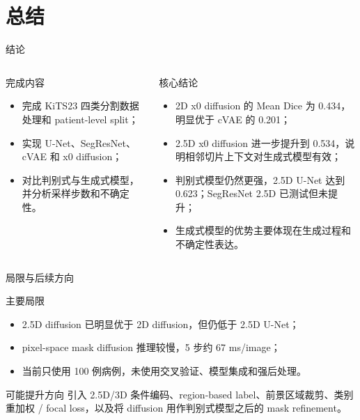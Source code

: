 \documentclass[10pt]{beamer}
\begin{document}
\section{总结}

\begin{frame}{结论}
  \begin{columns}[T]
      \begin{exampleblock}{完成内容}
        \begin{itemize}
          \item 完成 KiTS23 四类分割数据处理和 patient-level split；
          \item 实现 U-Net、SegResNet、cVAE 和 x0 diffusion；
          \item 对比判别式与生成式模型，并分析采样步数和不确定性。
        \end{itemize}
      \end{exampleblock}
      \begin{alertblock}{核心结论}
        \begin{itemize}
          \item 2D x0 diffusion 的 Mean Dice 为 0.434，明显优于 cVAE 的 0.201；
          \item 2.5D x0 diffusion 进一步提升到 0.534，说明相邻切片上下文对生成式模型有效；
          \item 判别式模型仍然更强，2.5D U-Net 达到 0.623；SegResNet 2.5D 已测试但未提升；
          \item 生成式模型的优势主要体现在生成过程和不确定性表达。
        \end{itemize}
      \end{alertblock}
  \end{columns}
\end{frame}

\begin{frame}{局限与后续方向}
  \begin{block}{主要局限}
    \begin{itemize}
      \item 2.5D diffusion 已明显优于 2D diffusion，但仍低于 2.5D U-Net；
      \item pixel-space mask diffusion 推理较慢，5 步约 67 ms/image；
      \item 当前只使用 100 例病例，未使用交叉验证、模型集成和强后处理。
    \end{itemize}
  \end{block}
  \begin{exampleblock}{可能提升方向}
    引入 2.5D/3D 条件编码、region-based label、前景区域裁剪、类别重加权 / focal loss，以及将 diffusion 用作判别式模型之后的 mask refinement。
  \end{exampleblock}
\end{frame}
\end{document}
